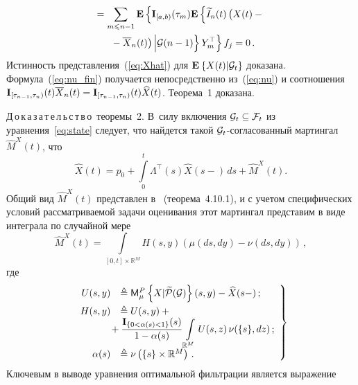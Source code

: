 \begin{multicols}{2}
{ \noindent
 \begin{multline*}
 {}=  \sum\limits_{m \leqslant n-1}\mathbf{E}\left\{\mathbf{I}_{[a,b)}(\tau_m)
 \mathbf{E}\left\{\widetilde{I}_n(t)\left(\vphantom{\overline{X}_n}
 X(t)- {}\right.\right.\right.\\
\left.\left.\left. {}- \overline{X}_n(t)\right)
 \Big \vert\G(n-1)\right\}Y_m^{\top}\right\}f_j=0\,.
 \end{multline*}
 Истинность представления~(\ref{eq:Xhat}) для $\mathbf{E}_{  }\left\{ \mathop{X(t)|{\mathcal G}_t} \right\}$ доказана.
 Формула~(\ref{eq:nu_fin}) получается непосредственно из~(\ref{eq:nu}) и
 соотношения $\mathbf{I}_{[\tau_{n-1},\tau_n)}(t)\overline{X}_n(t) \hm=
 \mathbf{I}_{[\tau_{n-1},\tau_n)}(t)\widehat{X}(t)$. Теорема~1 доказана.

\smallskip

\noindent
Д\,о\,к\,а\,з\,а\,т\,е\,л\,ь\,с\,т\,в\,о\ теоремы~2.
В~силу включения ${{\mathcal G}_t\subseteq{\mathcal F}_t}$ из уравнения~\eqref{eq:state}
следует, что найдется такой ${\mathcal G}_t$-со\-гла\-со\-ван\-ный
мартингал $\widehat{M}^{X}(t)$, что
\begin{equation}
    \widehat{X}(t)=p_0+\int\limits_0^t\Lambda^{\top}(s)\widehat{X}(s-)
\,    ds+\widehat{M}^{X}(t).
\label{eq:martrepr}
\end{equation}
Общий вид $\widehat{M}^{X}(t)$ представлен в~\cite{LS_86} (теорема~4.10.1),
и с учетом специфических условий рассматриваемой задачи оценивания этот
мартингал представим в виде интеграла по случайной мере
\begin{equation}
    \widehat{M}^{X}(t)=\int\limits_{[0,t]\times\mathbb{R}^M}H(s,y)
    \left(\mu(ds,dy)-\nu(ds,dy)\right)\,,
\label{eq:mhat}
\end{equation}
где
\begin{equation}
\left.
\begin{array}{rl}
\displaystyle
U(s,y) &\ebd \mmme{\mu}{P}{X|\widetilde{\ppp}(\mathcal{G})}(s,y)- \widehat{X}(s-)\,;
\\[6pt]
\displaystyle
H(s,y) &\ebd U(s,y)+{}\\
&\hspace*{-4mm}{}+ \fr{\displaystyle \bi_{\{0 < \alpha(s) <1\}}(s)}
{\displaystyle 1-\alpha(s)}
\int\limits_{\mathbb{R}^M}U(s,z)\,\nu(\{s\}, dz)\,;
\\[6pt]
\displaystyle
\alpha(s)& \ebd \nu\left(\{s\}\times \mathbb{R}^M\right)\,.
\end{array}
\right\}
\label{eq:not}
\end{equation}
 Ключевым в выводе уравнения оптимальной фильт\-ра\-ции является выражение
}
\end{multicols}
